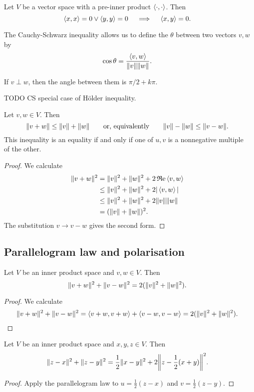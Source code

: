 \begin{corollary} \label{corollary:preInnerProductCSBZero}
Let $V$ be a vector space with a pre-inner product $\left\langle \cdot,\cdot \right\rangle$. Then
\[ \left\langle x,x \right\rangle=0\lor\left\langle y,y \right\rangle=0 \quad\implies\quad \left\langle x,y \right\rangle = 0. \]
\end{corollary}
\begin{definition}
The Cauchy-Schwarz inequality allows us to define the  $\theta$ between two vectors $v,w$ by
\[ \cos\theta = \frac{\left\langle v,w \right\rangle}{\lVert v\rVert\lVert w\rVert}.\]
\end{definition}
\begin{lemma}
If $v\perp w$, then the angle between them is $\pi/2 + k\pi$.
\end{lemma}

TODO CS special case of Hölder inequality.

\begin{theorem}
Let $v,w\in V$. Then
\[ \lVert v+w\rVert \leq \lVert v\rVert+\lVert w\rVert \qquad\text{or, equivalently}\qquad \lVert v\rVert-\lVert w\rVert\leq \lVert v-w\rVert. \]
This inequality is an equality if and only if one of $u,v$ is a nonnegative multiple of the other.
\end{theorem}
\begin{proof}
We calculate
\begin{align*}
\lVert v+w\rVert^2 &= \lVert v\rVert^2+\lVert w\rVert^2+2\operatorname{\mathfrak{R}e}\left\langle v,w \right\rangle \\
&\leq \lVert v\rVert^2+\lVert w\rVert^2+2|\left\langle v,w \right\rangle| \\
&\leq \lVert v\rVert^2+\lVert w\rVert^2+2\lVert v\rVert\lVert w\rVert \\
&= (\lVert v\rVert+\lVert w\rVert)^2.
\end{align*}
The substitution $v\to v-w$ gives the second form.
\end{proof}

\subsection{Parallelogram law and polarisation}
\begin{theorem} \label{theorem:parallelogramLaw}
Let $V$ be an inner product space and $v,w\in V$. Then
\[ \lVert v+w\rVert^2 + \lVert v-w\rVert^2 = 2 (\lVert v\rVert^2+\lVert w\rVert^2). \]
\end{theorem}
\begin{proof}
We calculate
\begin{align*}
\lVert v+w\rVert^2 + \lVert v-w\rVert^2 = \left\langle v+w, v+w \right\rangle+\left\langle v-w,v-w \right\rangle = 2(\lVert v\rVert^2 + \lVert w\rVert^2).
\end{align*}
\end{proof}
\begin{corollary}
Let $V$ be an inner product space and $x,y,z\in V$. Then
\[ \norm{z-x}^2 + \norm{z-y}^2 = \frac{1}{2}\norm{x-y}^2 + 2\norm*{z-\frac{1}{2}(x+y)}^2. \]
\end{corollary}
\begin{proof}
Apply the parallelogram law to $u = \frac{1}{2}(z-x)$ and $v = \frac{1}{2}(z-y)$.
\end{proof}

